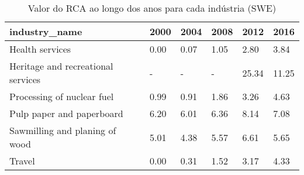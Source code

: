 \begin{table}
\centering
\caption{Valor do RCA ao longo dos anos para cada indústria (SWE)}
\begin{tabular}{p{6cm}p{1.5cm}p{1.5cm}p{1.5cm}p{1.5cm}p{1.5cm}}
\toprule
                     industry\_name & 2000 & 2004 & 2008 &  2012 &  2016 \\
\midrule
                   Health services & 0.00 & 0.07 & 1.05 &  2.80 &  3.84 \\
Heritage and recreational services &    - &    - &    - & 25.34 & 11.25 \\
        Processing of nuclear fuel & 0.99 & 0.91 & 1.86 &  3.26 &  4.63 \\
         Pulp paper and paperboard & 6.20 & 6.01 & 6.36 &  8.14 &  7.08 \\
    Sawmilling and planing of wood & 5.01 & 4.38 & 5.57 &  6.61 &  5.65 \\
                            Travel & 0.00 & 0.31 & 1.52 &  3.17 &  4.33 \\
\bottomrule
\end{tabular}
\end{table}

